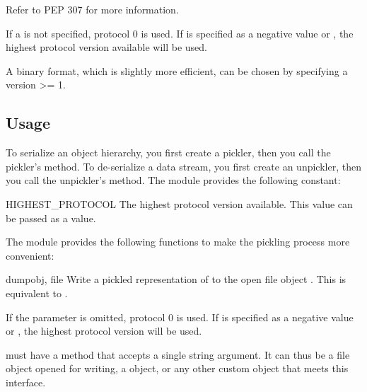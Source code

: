 Refer to PEP 307 for more information.

If a  is not specified, protocol 0 is used.
If  is specified as a negative value
or ,
the highest protocol version available will be used.


A binary format, which is slightly more efficient, can be chosen by
specifying a  version >= 1.

\subsection{Usage}

To serialize an object hierarchy, you first create a pickler, then you
call the pickler's  method.  To de-serialize a data
stream, you first create an unpickler, then you call the unpickler's
 method.  The  module provides the
following constant:

\begin{datadesc}{HIGHEST_PROTOCOL}
The highest protocol version available.  This value can be passed
as a  value.
\end{datadesc}


The  module provides the
following functions to make the pickling process more convenient:

\begin{funcdesc}{dump}{obj, file}
Write a pickled representation of  to the open file object
.  This is equivalent to
.

If the  parameter is omitted, protocol 0 is used.
If  is specified as a negative value
or ,
the highest protocol version will be used.


 must have a  method that accepts a single
string argument.  It can thus be a file object opened for writing, a
 object, or any other custom
object that meets this interface.
\end{funcdesc}


